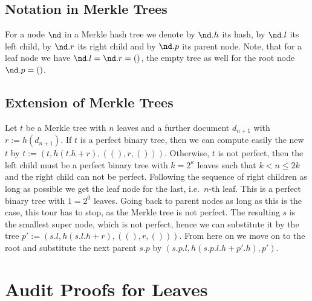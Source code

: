 \subsection{Notation in Merkle Trees}
For a node \(\nd\) in a Merkle hash tree we denote
by \(\nd.h\) its hash, by \(\nd.l\) its left child, 
by \(\nd.r\) its right child and by 
\(\nd.p\) its parent node. Note, that for a leaf
node we have \(\nd.l = \nd.r = ()\), the empty tree
as well for the root node \(\nd.p = ()\).

\subsection{Extension of Merkle Trees}
Let \(t\) be a Merkle tree with \(n\) leaves and a further document \(d_{n+1}\)
with \(r:=h(d_{n+1})\).
If \(t\) is a perfect binary tree, then we can compute easily the new \(t\)
by \(t := (t, h(t.h+r), ((),r,()))\).
Otherwise, \(t\) is not perfect, then the left child must be a perfect binary tree
with \(k = 2^\kappa\) leaves such that \(k < n \le 2k\) and
the right child can not be perfect.
Following the sequence of right children as long as possible we get the leaf node
for the last, i.e.\ \(n\)-th leaf. This is a perfect binary tree with \(1=2^0\) leaves.
Going back to parent nodes as long as this is the case, this tour has to stop, as 
the Merkle tree is not perfect. The resulting \(s\) is the smallest super node, which 
is not perfect, hence we can substitute it by the tree
\(p' := (s.l, h(s.l.h+r), ((),r,()))\).
From here on we move on to the root and substitute the next parent \(s.p\) by
\((s.p.l, h(s.p.l.h+p'.h), p')\).



\section{Audit Proofs for Leaves}


